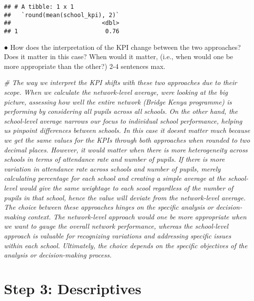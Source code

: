 \documentclass[
]{article}
\newenvironment{Shaded}{\begin{snugshade}}{\end{snugshade}}
\newcommand{\CommentTok}[1]{\textcolor[rgb]{0.56,0.35,0.01}{\textit{#1}}}
\begin{document}
\begin{verbatim}
## # A tibble: 1 x 1
##   `round(mean(school_kpi), 2)`
##                          <dbl>
## 1                         0.76
\end{verbatim}

● How does the interpretation of the KPI change between the two
approaches? Does it matter in this case? When would it matter, (i.e.,
when would one be more appropriate than the other?) 2-4 sentences max.

\begin{Shaded}
\begin{Highlighting}[]
\CommentTok{\# The way we interpret the KPI shifts with these two approaches due to their scope. When we calculate the network{-}level average, we\textquotesingle{}re looking at the big picture, assessing how well the entire network (Bridge Kenya programme) is performing by considering all pupils across all schools. On the other hand, the school{-}level average narrows our focus to individual school performance, helping us pinpoint differences between schools. In this case it doesn\textquotesingle{}t matter much because we get the same values for the KPIs through both approaches when rounded to two decimal places. However, it would matter when there is more heterogeneity across schools in terms of attendance rate and number of pupils. If there is more variation in attendance rate across schools and number of pupils, merely calculating percentage for each school and creating a simple average at the school{-}level would give the same weightage to each scool regardless of the number of pupils in that school, hence the value will deviate from the network{-}level average. The choice between these approaches hinges on the specific analysis or decision{-}making context. The network{-}level approach would one be more appropriate when we want to gauge the overall network performance, whereas the school{-}level approach is valuable for recognizing variations and addressing specific issues within each school. Ultimately, the choice depends on the specific objectives of the analysis or decision{-}making process.}
\end{Highlighting}
\end{Shaded}

\hypertarget{step-3-descriptives}{%
\section{Step 3: Descriptives}\label{step-3-descriptives}}
\end{document}
